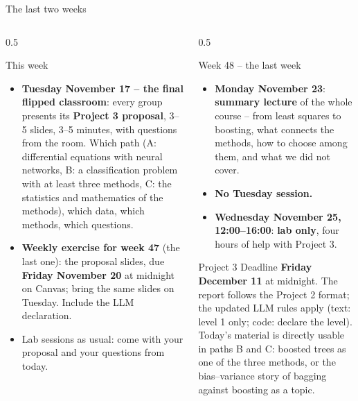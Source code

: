 \documentclass[10pt,aspectratio=169]{beamer}
\begin{document}
\begin{frame}{The last two weeks}
\footnotesize
\begin{columns}[T]
\begin{column}{0.5\textwidth}
\begin{block}{This week}
\begin{itemize}
  \item \textbf{Tuesday November 17 -- the final flipped
    classroom}: every group presents its \textbf{Project 3 proposal},
    3--5 slides, 3--5 minutes, with questions from the room.  Which path
    (A: differential equations with neural networks, B: a classification
    problem with at least three methods, C: the statistics and mathematics of
    the methods), which data, which methods, which questions.
  \item \textbf{Weekly exercise for week 47} (the last one): the proposal
    slides, due \textbf{Friday November 20} at midnight on Canvas; bring the
    same slides on Tuesday.  Include the LLM declaration.
  \item Lab sessions as usual: come with your proposal and your questions
    from today.
\end{itemize}
\end{block}
\end{column}
\begin{column}{0.5\textwidth}
\begin{block}{Week 48 -- the last week}
\begin{itemize}
  \item \textbf{Monday November 23}: \textbf{summary lecture} of the whole
    course -- from least squares to boosting, what connects the methods, how
    to choose among them, and what we did not cover.
  \item \textbf{No Tuesday session.}
  \item \textbf{Wednesday November 25, 12:00--16:00}: \textbf{lab only},
    four hours of help with Project 3.
\end{itemize}
\end{block}
\begin{block}{Project 3}
Deadline \textbf{Friday December 11} at midnight.  The report follows the
Project 2 format; the updated LLM rules apply (text: level 1 only; code:
declare the level).  Today's material is directly usable in paths B and C:
boosted trees as one of the three methods, or the bias--variance story of
bagging against boosting as a topic.
\end{block}
\end{column}
\end{columns}
\end{frame}
\end{document}
